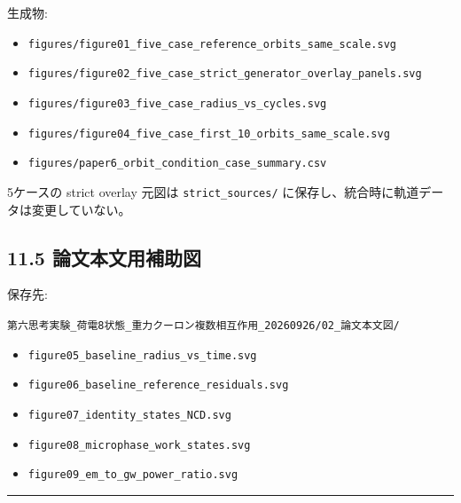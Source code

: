 \documentclass[
  a4paper,
]{ltjsarticle}
\providecommand{\tightlist}{%
  \setlength{\itemsep}{0pt}\setlength{\parskip}{0pt}}
\begin{document}
生成物:

\begin{itemize}
\tightlist
\item
  \texttt{figures/\allowbreak{}figure01\_\allowbreak{}five\_\allowbreak{}case\_\allowbreak{}reference\_\allowbreak{}orbits\_\allowbreak{}same\_\allowbreak{}scale.svg}
\item
  \texttt{figures/\allowbreak{}figure02\_\allowbreak{}five\_\allowbreak{}case\_\allowbreak{}strict\_\allowbreak{}generator\_\allowbreak{}overlay\_\allowbreak{}panels.svg}
\item
  \texttt{figures/\allowbreak{}figure03\_\allowbreak{}five\_\allowbreak{}case\_\allowbreak{}radius\_\allowbreak{}vs\_\allowbreak{}cycles.svg}
\item
  \texttt{figures/\allowbreak{}figure04\_\allowbreak{}five\_\allowbreak{}case\_\allowbreak{}first\_\allowbreak{}10\_\allowbreak{}orbits\_\allowbreak{}same\_\allowbreak{}scale.svg}
\item
  \texttt{figures/\allowbreak{}paper6\_\allowbreak{}orbit\_\allowbreak{}condition\_\allowbreak{}case\_\allowbreak{}summary.csv}
\end{itemize}

5ケースの strict overlay 元図は \texttt{strict\_\allowbreak{}sources/\allowbreak{}}
に保存し、統合時に軌道データは変更していない。

\subsection{11.5
論文本文用補助図}\label{ux8ad6ux6587ux672cux6587ux7528ux88dcux52a9ux56f3}

保存先:

\texttt{第六思考実験\_\allowbreak{}荷電8状態\_\allowbreak{}重力クーロン複数相互作用\_\allowbreak{}20260926/\allowbreak{}02\_\allowbreak{}論文本文図/\allowbreak{}}

\begin{itemize}
\tightlist
\item
  \texttt{figure05\_baseline\_radius\_vs\_time.svg}
\item
  \texttt{figure06\_baseline\_reference\_residuals.svg}
\item
  \texttt{figure07\_identity\_states\_NCD.svg}
\item
  \texttt{figure08\_microphase\_work\_states.svg}
\item
  \texttt{figure09\_em\_to\_gw\_power\_ratio.svg}
\end{itemize}

\begin{center}\rule{0.5\linewidth}{0.5pt}\end{center}
\end{document}
